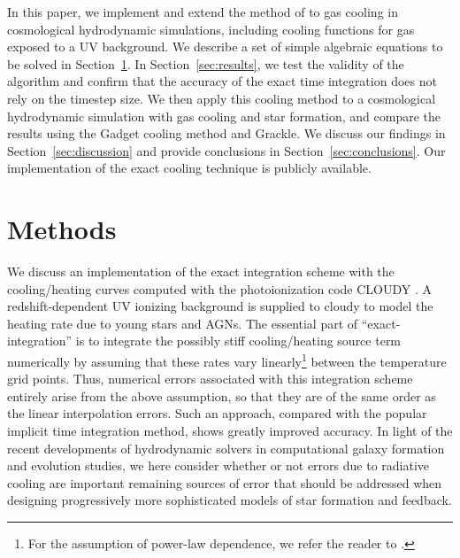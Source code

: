 \documentclass[a4paper,fleqn,usenatbib,useAMS, twocolumn]{mnras}
\begin{document}
In this paper, we implement and extend the method of
\cite{Townsend2009} to gas cooling in cosmological hydrodynamic
simulations, including cooling functions for gas exposed to a UV
background. We describe a set of simple algebraic equations to be
solved in Section~\ref{sec:method}. In Section~\ref{sec:results}, we
test the validity of the algorithm and confirm that the accuracy of
the exact time integration does not rely on the timestep size. We then
apply this cooling method to a cosmological hydrodynamic simulation
with gas cooling and star formation, and compare the results using the
{\sc Gadget} cooling method and {\sc Grackle}. We discuss our
findings in Section~\ref{sec:discussion} and provide conclusions
in Section~\ref{sec:conclusions}.
Our implementation
of the exact cooling technique is publicly available. 

\section{Methods}
\label{sec:method}

We discuss an implementation of the exact integration scheme with
the cooling/heating curves computed with the
photoionization code {\sc CLOUDY} \citep{Cloudy}.  A
redshift-dependent UV ionizing background is supplied to {\sc cloudy}
to model the heating rate due to young stars and AGNs. The essential
part of ``exact-integration'' is to integrate the possibly stiff
cooling/heating source term numerically by assuming that these rates
vary linearly\footnote{For the assumption of power-law dependence, we
refer the reader to \cite{Townsend2009}.}  between the temperature
grid points. Thus, numerical errors associated with this integration
scheme entirely arise from the above assumption, so that they are of
the same order as the linear interpolation errors. Such an
approach, compared with the popular implicit time
integration method, shows greatly improved accuracy. In light of the recent
developments of hydrodynamic solvers in computational galaxy formation
and evolution studies, we here consider whether or not errors due
to radiative cooling are important remaining sources of
error that should be addressed when designing progressively more
sophisticated models of star formation and feedback.
\end{document}
